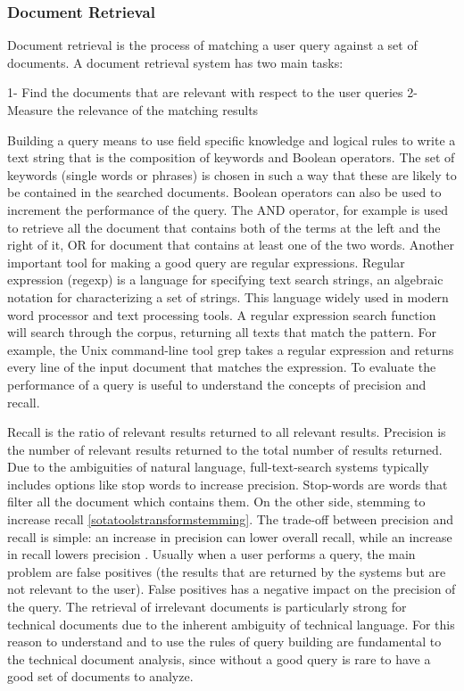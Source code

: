 \documentclass[]{book}
\begin{document}
\subsubsection{Document Retrieval}\label{sotatoolsimportretrieval}

Document retrieval is the process of matching a user query against a set
of documents. A document retrieval system has two main tasks:

1- Find the documents that are relevant with respect to the user queries
2- Measure the relevance of the matching results

Building a query means to use field specific knowledge and logical rules
to write a text string that is the composition of keywords and Boolean
operators. The set of keywords (single words or phrases) is chosen in
such a way that these are likely to be contained in the searched
documents. Boolean operators can also be used to increment the
performance of the query. The AND operator, for example is used to
retrieve all the document that contains both of the terms at the left
and the right of it, OR for document that contains at least one of the
two words. Another important tool for making a good query are regular
expressions. Regular expression (regexp) is a language for specifying
text search strings, an algebraic notation for characterizing a set of
strings. This language widely used in modern word processor and text
processing tools. A regular expression search function will search
through the corpus, returning all texts that match the pattern. For
example, the Unix command-line tool grep takes a regular expression and
returns every line of the input document that matches the expression. To
evaluate the performance of a query is useful to understand the concepts
of precision and recall.

Recall is the ratio of relevant results returned to all relevant
results. Precision is the number of relevant results returned to the
total number of results returned. Due to the ambiguities of natural
language, full-text-search systems typically includes options like stop
words to increase precision. Stop-words are words that filter all the
document which contains them. On the other side, stemming to increase
recall \ref{sotatoolstransformstemming}. The trade-off between precision
and recall is simple: an increase in precision can lower overall recall,
while an increase in recall lowers precision \citep{yuwono1996search}.
Usually when a user performs a query, the main problem are false
positives (the results that are returned by the systems but are not
relevant to the user). False positives has a negative impact on the
precision of the query. The retrieval of irrelevant documents is
particularly strong for technical documents due to the inherent
ambiguity of technical language. For this reason to understand and to
use the rules of query building are fundamental to the technical
document analysis, since without a good query is rare to have a good set
of documents to analyze.
\end{document}
